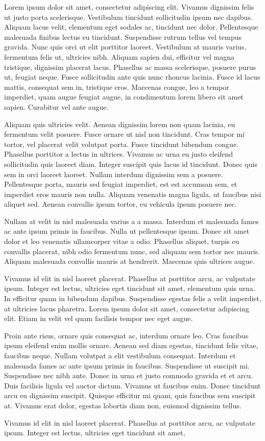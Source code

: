 \documentclass[a4paper,11pt]{article}
\begin{document}
Lorem ipsum dolor sit amet, consectetur adipiscing elit. Vivamus dignissim felis ut justo porta scelerisque. Vestibulum tincidunt sollicitudin ipsum nec dapibus. Aliquam lacus velit, elementum eget sodales ac, tincidunt nec dolor. Pellentesque malesuada finibus lectus eu tincidunt. Suspendisse rutrum tellus vel tempus gravida. Nunc quis orci ut elit porttitor laoreet. Vestibulum at mauris varius, fermentum felis ut, ultricies nibh. Aliquam sapien dui, efficitur vel magna tristique, dignissim placerat lacus. Phasellus ac massa scelerisque, posuere purus ut, feugiat neque. Fusce sollicitudin ante quis nunc rhoncus lacinia. Fusce id lacus mattis, consequat sem in, tristique eros. Maecenas congue, leo a tempor imperdiet, quam augue feugiat augue, in condimentum lorem libero sit amet sapien. Curabitur vel ante augue.

Aliquam quis ultricies velit. Aenean dignissim lorem non quam lacinia, eu fermentum velit posuere. Fusce ornare ut nisl non tincidunt. Cras tempor mi tortor, vel placerat velit volutpat porta. Fusce tincidunt bibendum congue. Phasellus porttitor a lectus in ultrices. Vivamus ac urna eu justo eleifend sollicitudin quis laoreet diam. Integer suscipit quis lacus id tincidunt. Donec quis sem in orci laoreet laoreet. Nullam interdum dignissim sem a posuere. Pellentesque porta, mauris sed feugiat imperdiet, est est accumsan sem, et imperdiet eros mauris non nulla. Aliquam venenatis magna ligula, ut faucibus nisi aliquet sed. Aenean convallis ipsum tortor, eu vehicula ipsum posuere nec.

Nullam at velit in nisl malesuada varius a a massa. Interdum et malesuada fames ac ante ipsum primis in faucibus. Nulla ut pellentesque ipsum. Donec sit amet dolor et leo venenatis ullamcorper vitae a odio. Phasellus aliquet, turpis eu convallis placerat, nibh odio fermentum nunc, sed aliquam sem tortor nec mauris. Aliquam malesuada convallis mauris at hendrerit. Maecenas quis ultrices augue.

Vivamus id elit in nisl laoreet placerat. Phasellus at porttitor arcu, ac vulputate ipsum. Integer est lectus, ultricies eget tincidunt sit amet, elementum quis urna. In efficitur quam in bibendum dapibus. Suspendisse egestas felis a velit imperdiet, at ultricies lacus pharetra. Lorem ipsum dolor sit amet, consectetur adipiscing elit. Etiam in velit vel quam facilisis tempor nec eget augue.

Proin ante risus, ornare quis consequat ac, interdum ornare leo. Cras faucibus ipsum eleifend enim mollis ornare. Aenean sed diam egestas, tincidunt felis vitae, faucibus neque. Nullam volutpat a elit vestibulum consequat. Interdum et malesuada fames ac ante ipsum primis in faucibus. Suspendisse ut suscipit mi. Suspendisse nec nibh ante. Donec in urna et justo commodo gravida et et arcu. Duis facilisis ligula vel auctor dictum. Vivamus ut faucibus enim. Donec tincidunt arcu eu dignissim suscipit. Quisque efficitur mi quam, quis faucibus sem suscipit at. Vivamus erat dolor, egestas lobortis diam non, euismod dignissim tellus.

Vivamus id elit in nisl laoreet placerat. Phasellus at porttitor arcu, ac vulputate ipsum. Integer est lectus, ultricies eget tincidunt sit amet, 
\end{document}

